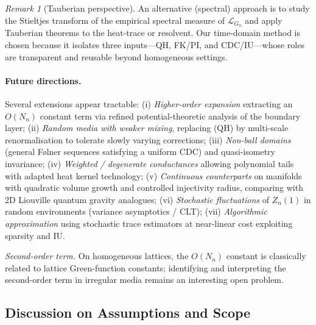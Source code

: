 \documentclass{article}
\numberwithin{equation}{section}
\theoremstyle{definition}
\theoremstyle{remark}
\newtheorem{remark}[theorem]{Remark}
\newcommand{\LL}{\mathcal{L}}
\begin{document}
\begin{remark}[Tauberian perspective]
An alternative (spectral) approach is to study the Stieltjes transform of the empirical spectral measure of $\LL_{G_n}$ and apply Tauberian theorems to the heat-trace or resolvent. Our time-domain method is chosen because it isolates three inputs---QH, FK/PI, and CDC/IU---whose roles are transparent and reusable beyond homogeneous settings.
\end{remark}

\paragraph{Future directions.} Several extensions appear tractable: (i) \emph{Higher-order expansion} extracting an $O(N_n)$ constant term via refined potential-theoretic analysis of the boundary layer; (ii) \emph{Random media with weaker mixing}, replacing (QH) by multi-scale renormalisation to tolerate slowly varying corrections; (iii) \emph{Non-ball domains} (general Følner sequences satisfying a uniform CDC) and quasi-isometry invariance; (iv) \emph{Weighted / degenerate conductances} allowing polynomial tails with adapted heat kernel technology; (v) \emph{Continuous counterparts} on manifolds with quadratic volume growth and controlled injectivity radius, comparing with 2D Liouville quantum gravity analogues; (vi) \emph{Stochastic fluctuations} of $Z_n(1)$ in random environments (variance asymptotics / CLT); (vii) \emph{Algorithmic approximation} using stochastic trace estimators at near-linear cost exploiting sparsity and IU.

\smallskip
\noindent\emph{Second-order term.} On homogeneous lattices, the $O(N_n)$ constant is classically related to lattice Green-function constants; identifying and interpreting the second-order term in irregular media remains an interesting open problem.

\subsection{Discussion on Assumptions and Scope}
\end{document}
